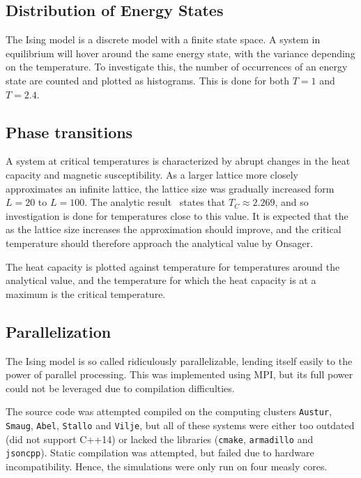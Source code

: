 \documentclass[aps,reprint]{revtex4-1}
\begin{document}
\subsection{Distribution of Energy States}
The Ising model is a discrete model with a finite state space. A system in
equilibrium will hover around the same energy state, with the variance depending
on the temperature. To investigate this, the number of occurrences of an energy
state are counted and plotted as histograms. This is done for both \(T=1\) and \(T=2.4\).

\subsection{Phase transitions} \label{sec:phase transitions}

A system at critical temperatures is characterized by abrupt changes in the
heat capacity and magnetic susceptibility. As a larger lattice more closely
approximates an infinite lattice,
the lattice size was gradually increased form \(L = 20\) to $L = 100$. The
analytic result~\cite{physicslectures} states that $T_C \approx 2.269$, and so
investigation is done 
for temperatures close to this value. It is expected that the as the lattice size
increases the approximation should improve, and the critical temperature should
therefore approach the analytical value by Onsager.

The heat capacity is plotted against temperature for temperatures around the
analytical value, and the temperature for which the heat capacity is at a
maximum is the critical temperature.  


\subsection{Parallelization}
The Ising model is so called ridiculously parallelizable, lending itself easily
to the power of parallel processing. This was implemented using MPI, but its
full power could not be leveraged due to compilation difficulties.

The source code was attempted compiled on the computing clusters
\texttt{Austur}, \texttt{Smaug}, \texttt{Abel}, \texttt{Stallo} and
\texttt{Vilje}, but all of these systems were either too outdated (did not
support C++14) or lacked the libraries (\texttt{cmake}, \texttt{armadillo} and
\texttt{jsoncpp}). Static compilation was attempted, but failed due to hardware
incompatibility. Hence, the simulations were only run on four measly cores. 
\end{document}
